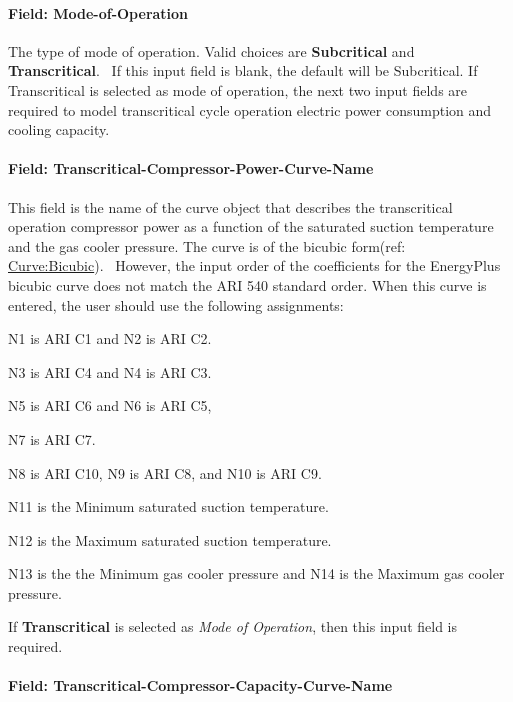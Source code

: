 \paragraph{Field: Mode-of-Operation}\label{field-mode-of-operation}

The type of mode of operation. Valid choices are \textbf{Subcritical} and \textbf{Transcritical}.~ If this input field is blank, the default will be Subcritical. If Transcritical is selected as mode of operation, the next two input fields are required to model transcritical cycle operation electric power consumption and cooling capacity.

\paragraph{Field: Transcritical-Compressor-Power-Curve-Name}\label{field-transcritical-compressor-power-curve-name}

This field is the name of the curve object that describes the transcritical operation compressor power as a function of the saturated suction temperature and the gas cooler pressure. The curve is of the bicubic form(ref: \hyperref[curvebicubic]{Curve:Bicubic}).~ However, the input order of the coefficients for the EnergyPlus bicubic curve does not match the ARI 540 standard order. When this curve is entered, the user should use the following assignments:

N1 is ARI C1 and N2 is ARI C2.

N3 is ARI C4 and N4 is ARI C3.

N5 is ARI C6 and N6 is ARI C5,

N7 is ARI C7.

N8 is ARI C10, N9 is ARI C8, and N10 is ARI C9.

N11 is the Minimum saturated suction temperature.

N12 is the Maximum saturated suction temperature.

N13 is the the Minimum gas cooler pressure and N14 is the Maximum gas cooler pressure.

If \textbf{Transcritical} is selected as \textit{Mode of Operation}, then this input field is required.

\paragraph{Field: Transcritical-Compressor-Capacity-Curve-Name}\label{field-transcritical-compressor-capacity-curve-name}


